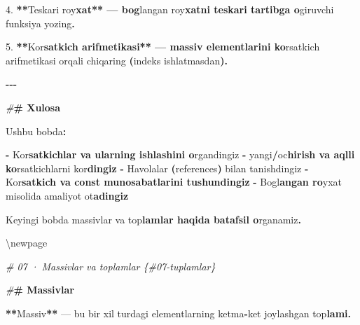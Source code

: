 \documentclass[a4paper,11pt,twoside,openright]{book}
\newenvironment{Shaded}{\begin{snugshade}}{\end{snugshade}}
\newcommand{\CharTok}[1]{\textcolor[rgb]{0.31,0.60,0.02}{#1}}
\newcommand{\ErrorTok}[1]{\textcolor[rgb]{0.64,0.00,0.00}{\textbf{#1}}}
\newcommand{\FloatTok}[1]{\textcolor[rgb]{0.00,0.00,0.81}{#1}}
\newcommand{\NormalTok}[1]{#1}
\newcommand{\OperatorTok}[1]{\textcolor[rgb]{0.81,0.36,0.00}{\textbf{#1}}}
\newcommand{\PreprocessorTok}[1]{\textcolor[rgb]{0.56,0.35,0.01}{\textit{#1}}}
\begin{document}
\begin{Shaded}
\begin{Highlighting}[]
\FloatTok{4.} \OperatorTok{**}\NormalTok{Teskari ro}\CharTok{\textquotesingle{}y}\ErrorTok{xat** — bog}\CharTok{\textquotesingle{}}\NormalTok{langan ro}\CharTok{\textquotesingle{}y}\ErrorTok{xatni teskari tartibga o}\CharTok{\textquotesingle{}}\NormalTok{giruvchi funksiya yozing}\OperatorTok{.}

\FloatTok{5.} \OperatorTok{**}\NormalTok{Ko}\CharTok{\textquotesingle{}r}\ErrorTok{satkich arifmetikasi** — massiv elementlarini ko}\CharTok{\textquotesingle{}}\NormalTok{rsatkich arifmetikasi orqali chiqaring }\OperatorTok{(}\NormalTok{indeks ishlatmasdan}\OperatorTok{).}

\OperatorTok{{-}{-}{-}}

\PreprocessorTok{\#}\ErrorTok{\# Xulosa}

\NormalTok{Ushbu bobda}\OperatorTok{:}

\OperatorTok{{-}}\NormalTok{ Ko}\CharTok{\textquotesingle{}r}\ErrorTok{satkichlar va ularning ishlashini o}\CharTok{\textquotesingle{}}\NormalTok{rgandingiz}
\OperatorTok{{-}} \ErrorTok{\textasciigrave{}}\NormalTok{yangi}\ErrorTok{\textasciigrave{}}\OperatorTok{/}\ErrorTok{\textasciigrave{}}\NormalTok{o}\CharTok{\textquotesingle{}c}\ErrorTok{hirish\textasciigrave{} va aqlli ko}\CharTok{\textquotesingle{}}\NormalTok{rsatkichlarni ko}\CharTok{\textquotesingle{}r}\ErrorTok{dingiz}
\OperatorTok{{-}}\NormalTok{ Havolalar }\OperatorTok{(}\NormalTok{references}\OperatorTok{)}\NormalTok{ bilan tanishdingiz}
\OperatorTok{{-}}\NormalTok{ Ko}\CharTok{\textquotesingle{}r}\ErrorTok{satkich va \textasciigrave{}const\textasciigrave{} munosabatlarini tushundingiz}
\OperatorTok{{-}}\NormalTok{ Bog}\CharTok{\textquotesingle{}l}\ErrorTok{angan ro}\CharTok{\textquotesingle{}}\NormalTok{yxat misolida amaliyot o}\CharTok{\textquotesingle{}t}\ErrorTok{adingiz}

\NormalTok{Keyingi bobda massivlar va to}\CharTok{\textquotesingle{}p}\ErrorTok{lamlar haqida batafsil o}\CharTok{\textquotesingle{}}\NormalTok{rganamiz}\OperatorTok{.}


\NormalTok{\textbackslash{}newpage}

\PreprocessorTok{\# 07 · Massivlar va to\textquotesingle{}plamlar \{\#07{-}tuplamlar\}}

\PreprocessorTok{\#}\ErrorTok{\# Massivlar}

\OperatorTok{**}\NormalTok{Massiv}\OperatorTok{**}\NormalTok{ — bu bir xil turdagi elementlarning ketma}\OperatorTok{{-}}\NormalTok{ket joylashgan to}\CharTok{\textquotesingle{}p}\ErrorTok{lami.}


\end{Highlighting}
\end{Shaded}
\end{document}
